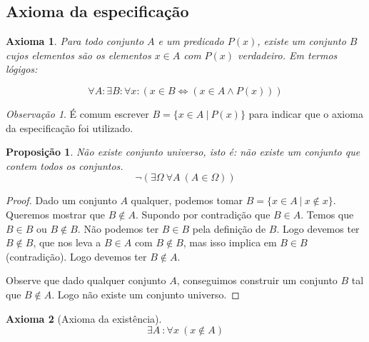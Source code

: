 \documentclass{article}
\newtheorem{axioma}{Axioma}
\newtheorem{prop}{Proposição}[section]
\theoremstyle{theorem}
\theoremstyle{lemma}
\theoremstyle{definition}
\theoremstyle{remark}
\newtheorem{obs}{Observação}[section]
\begin{document}
\subsection{Axioma da especificação}
\begin{axioma}
	Para todo conjunto \(A\) e um predicado \( P(x) \), existe um conjunto \(B\) cujos elementos são os elementos \(x\in A\) com \(P(x)\) verdadeiro.
	Em termos lógigos:

	\[ \forall A: \exists B: \forall x:  (x \in B \iff ( x \in A \land P(x))) \]
\end{axioma}
\begin{obs}
	É comum escrever \( B = \{ x\in A \: | \: P(x) \} \) para indicar que o axioma da especificação foi utilizado.
\end{obs}
\begin{prop}
	Não existe conjunto universo, isto é: não existe um conjunto que contem todos os conjuntos.
	\[ \neg ( \exists \Omega \: \forall A \: ( A\in \Omega) ) \]
\end{prop}
\begin{proof}
	Dado um conjunto \(A\) qualquer, podemos tomar \(B = \{ x\in A \: | \: x\not \in x \} \). Queremos mostrar que \( B \not \in A\). Supondo por contradição que  \(B\in A\). Temos que \(B\in B \) ou \(B \not \in B\). Não podemos ter \( B\in B\) pela definição de \(B\). Logo devemos ter \(B\not \in B\),  que nos leva a \( B\in A \) com \(B\not \in B\), mas isso implica em \(B\in B\) (contradição). Logo devemos ter \(B\not \in A\).  

	Observe que dado qualquer conjunto \(A\), conseguimos construir um conjunto \(B\) tal que \(B\not \in A\). Logo não existe um conjunto universo.
\end{proof}
\begin{axioma}[Axioma da existência]
	\[ \exists A \: : \forall x \:  ( x\not \in A ) \]
\end{axioma}
\end{document}
